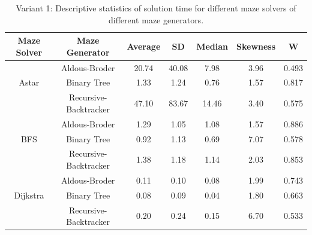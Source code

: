 \begin{table}[!ht]
    \centering
    \caption{Variant 1: Descriptive statistics of solution time for different maze solvers of different maze generators.} 
    \begin{tabular}{c c c c c c c}
    \hline
        Maze Solver & Maze Generator & Average & SD & Median & Skewness & W \\ \hline
        ~ & Aldous-Broder  & 20.74 & 40.08 & 7.98 & 3.96 & 0.493\\ 
        Astar & Binary Tree & 1.33 & 1.24 & 0.76 & 1.57 & 0.817\\ 
        ~ & Recursive-Backtracker & 47.10 & 83.67 & 14.46 & 3.40 & 0.575\\ \hline
        ~ & Aldous-Broder  & 1.29 & 1.05 & 1.08 & 1.57 & 0.886\\ 
        BFS & Binary Tree & 0.92 & 1.13 & 0.69 & 7.07 & 0.578\\ 
        ~ & Recursive-Backtracker & 1.38 & 1.18 & 1.14 & 2.03 & 0.853\\ \hline
        ~ & Aldous-Broder  & 0.11 & 0.10 & 0.08 & 1.99 & 0.743\\ 
        Dijkstra & Binary Tree & 0.08 & 0.09 & 0.04 & 1.80 & 0.663\\ 
        ~ & Recursive-Backtracker & 0.20 & 0.24 & 0.15 & 6.70 & 0.533 \\ \hline
    \end{tabular}
\end{table}

